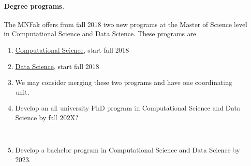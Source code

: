 \documentclass[oneside,final,10pt]{article}
\begin{document}
\paragraph{Degree programs.}

The MNFak  offers from fall 2018 two new programs at the Master of Science level in Computational Science and Data Science. These programs are
\begin{enumerate}
\item \href{{http://www.uio.no/english/studies/programmes/computational-science-master/index.html}}{Computational Science}, start fall 2018

\item \href{{http://www.uio.no/english/studies/programmes/datascience-master/index.html}}{Data Science}, start fall 2018

\item We may consider merging these two programs and have one coordinating unit.
\item Develop an all university PhD program in Computational Science and Data Science by fall 202X?


\

\item Develop a bachelor program in Computational Science and Data Science by 2023.
\end{enumerate}

\noindent
\end{document}
